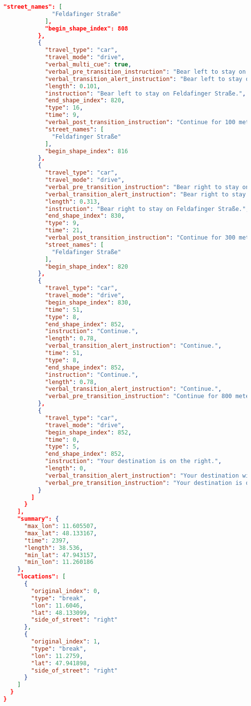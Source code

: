 \begin{lstlisting}[language=json,breaklines=true]
            "street_names": [
              "Feldafinger Straße"
            ],
            "begin_shape_index": 808
          },
          {
            "travel_type": "car",
            "travel_mode": "drive",
            "verbal_multi_cue": true,
            "verbal_pre_transition_instruction": "Bear left to stay on Feldafinger Straße. Then Bear right to stay on Feldafinger Straße.",
            "verbal_transition_alert_instruction": "Bear left to stay on Feldafinger Straße.",
            "length": 0.101,
            "instruction": "Bear left to stay on Feldafinger Straße.",
            "end_shape_index": 820,
            "type": 16,
            "time": 9,
            "verbal_post_transition_instruction": "Continue for 100 meters.",
            "street_names": [
              "Feldafinger Straße"
            ],
            "begin_shape_index": 816
          },
          {
            "travel_type": "car",
            "travel_mode": "drive",
            "verbal_pre_transition_instruction": "Bear right to stay on Feldafinger Straße.",
            "verbal_transition_alert_instruction": "Bear right to stay on Feldafinger Straße.",
            "length": 0.313,
            "instruction": "Bear right to stay on Feldafinger Straße.",
            "end_shape_index": 830,
            "type": 9,
            "time": 21,
            "verbal_post_transition_instruction": "Continue for 300 meters.",
            "street_names": [
              "Feldafinger Straße"
            ],
            "begin_shape_index": 820
          },
          {
            "travel_type": "car",
            "travel_mode": "drive",
            "begin_shape_index": 830,
            "time": 51,
            "type": 8,
            "end_shape_index": 852,
            "instruction": "Continue.",
            "length": 0.78,
            "verbal_transition_alert_instruction": "Continue.",
            "time": 51,
            "type": 8,
            "end_shape_index": 852,
            "instruction": "Continue.",
            "length": 0.78,
            "verbal_transition_alert_instruction": "Continue.",
            "verbal_pre_transition_instruction": "Continue for 800 meters."
          },
          {
            "travel_type": "car",
            "travel_mode": "drive",
            "begin_shape_index": 852,
            "time": 0,
            "type": 5,
            "end_shape_index": 852,
            "instruction": "Your destination is on the right.",
            "length": 0,
            "verbal_transition_alert_instruction": "Your destination will be on the right.",
            "verbal_pre_transition_instruction": "Your destination is on the right."
          }
        ]
      }
    ],
    "summary": {
      "max_lon": 11.605507,
      "max_lat": 48.133167,
      "time": 2397,
      "length": 38.536,
      "min_lat": 47.943157,
      "min_lon": 11.260186
    },
    "locations": [
      {
        "original_index": 0,
        "type": "break",
        "lon": 11.6046,
        "lat": 48.133099,
        "side_of_street": "right"
      },
      {
        "original_index": 1,
        "type": "break",
        "lon": 11.2759,
        "lat": 47.941898,
        "side_of_street": "right"
      }
    ]
  }
}
\end{lstlisting}